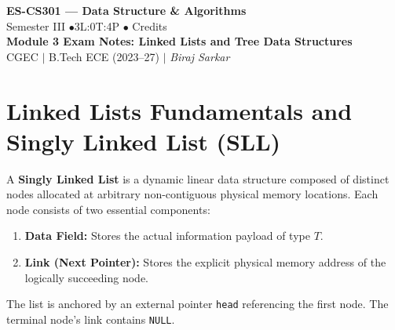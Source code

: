 \documentclass[12pt,a4paper]{article}
\begin{document}
\begin{center}
  {\LARGE\bfseries\color{myred} ES-CS301 --- Data Structure \& Algorithms}\\[5pt]
  {\normalsize\color{mydark} Semester III \quad$\bullet$\quad 3L:0T:4P \quad$\bullet$ Credits}\\[3pt]
  {\normalsize\color{myteal}\textbf{Module 3 Exam Notes: Linked Lists and Tree Data Structures}}\\[3pt]
  {\small\color{mydark} CGEC \;$|$\; B.Tech ECE (2023--27) \;$|$\; \textit{Biraj Sarkar}}
\end{center}
\vspace{2pt}
\noindent{\color{myred}\rule{\linewidth}{1.5pt}}
\vspace{2pt}

\hypersetup{linkcolor=mydark}
\tableofcontents
\hypersetup{linkcolor=myteal}
\newpage

\section{Linked Lists Fundamentals and Singly Linked List (SLL)}

\begin{tcolorbox}[defbox, title={\textbf{Definition: Singly Linked List (SLL) Architecture}}]
A \textbf{Singly Linked List} is a dynamic linear data structure composed of distinct nodes allocated at arbitrary non-contiguous physical memory locations. Each node consists of two essential components:
\begin{enumerate}[leftmargin=*, nosep]
  \item \textbf{Data Field:} Stores the actual information payload of type $T$.
  \item \textbf{Link (Next Pointer):} Stores the explicit physical memory address of the logically succeeding node.
\end{enumerate}
The list is anchored by an external pointer \texttt{head} referencing the first node. The terminal node's link contains \texttt{NULL}.
\end{tcolorbox}
\end{document}
